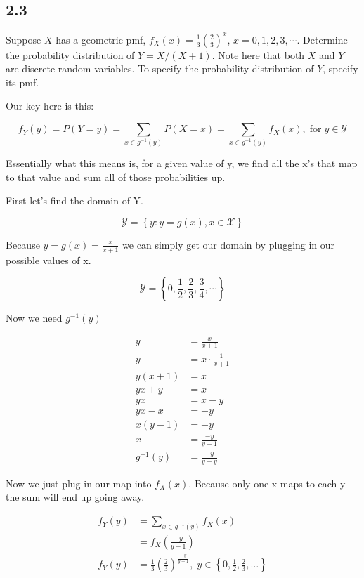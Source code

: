 \subsection*{2.3}

Suppose $X$ has a geometric pmf, $f_X(x) = \frac{1}{3}\left( \frac{2}{3} \right)^x$, $x=0,1,2,3,\cdots$. Determine the probability distribution of $Y = X/(X+1)$. Note here that both $X$ and $Y$ are discrete random variables. To specify the probability distribution of $Y$, specify its pmf.

Our key here is this: 

\[
	f_Y(y) = P(Y=y) = \sum_{x \in g^{-1}(y)}P(X=x) = \sum_{x \in g^{-1}(y)} f_X(x), \; \text{for} \; y \in \mathcal{Y}
\]

Essentially what this means is, for a given value of y, we find all the x's that map to that value and sum all of those probabilities up.

First let's find the domain of Y.

\[
	\mathcal{Y} = \left\{ y: y=g(x), x \in \mathcal{X} \right\}
\]

Because $y = g(x) = \frac{x}{x+1}$ we can simply get our domain by plugging in our possible values of x.

\[\mathcal{Y} = \left\{ 0, \frac{1}{2}, \frac{2}{3}, \frac{3}{4}, \cdots \right\}\]

Now we need $g^{-1}(y)$

\begin{align*}
	y &= \frac{x}{x+1} \\
	y &= x \cdot \frac{1}{x + 1} \\
	y(x+1) &= x \\
	yx + y &= x \\
	yx &= x-y \\
	yx - x &= -y \\
	x(y-1) &= -y \\
	x &= \frac{-y}{y-1} \\
	g^{-1}(y) &= \frac{-y}{y-y}
\end{align*}

Now we just plug in our map into $f_X(x)$. Because only one x maps to each y the sum will end up going away.

\begin{align*}
	f_Y(y) &= \sum_{x \in g^{-1}(y)}f_X(x) \\
	&= f_X\left( \frac{-y}{y-1} \right) \\
	f_Y(y) &= \frac{1}{3} \left( \frac{2}{3} \right)^{\frac{-y}{y-1}}, \; y \in \left\{ 0, \frac{1}{2}, \frac{2}{3}, \ldots \right\}
\end{align*}


